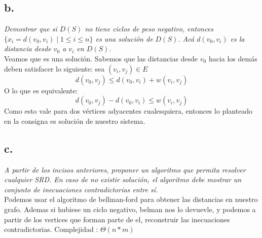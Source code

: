 \documentclass{article}
\begin{document}
\subsection*{b.}
  \textit{Demostrar que si $D(S)$ no tiene ciclos de peso negativo, entonces  \\
  $\{x_i = d(v_0, v_i) \mid 1 \leq i \leq n\}$ es una solución de $D(S)$. Acá $d(v_0, v_i)$ es la distancia desde $v_0$ a $v_i$ en $D(S)$.} \\

Veamos que es una solución. Sabemos que las distancias desde $v_0$ hacia los demás deben satisfacer lo siguiente: sea $(v_i, v_j) \in E$ 
\[
d(v_0, v_j) \leq d(v_0, v_i) + w(v_i, v_j)
\]
O lo que es equivalente:
\[
d(v_0, v_j) - d(v_0, v_i) \leq w(v_i, v_j)
\]
Como esto vale para dos vértices adyacentes cualesquiera, entonces lo planteado en la consigna es solución de nuestro sistema.

\subsection*{c.}
\textit{A partir de los incisos anteriores, proponer un algoritmo que permita resolver cualquier
SRD. En caso de no existir solución, el algoritmo debe mostrar un conjunto de inecuaciones
contradictorias entre sí.} \\

Podemos usar el algoritmo de bellman-ford para obtener las distancias en nuestro grafo. Ademas si hubiese un ciclo negativo, belman nos lo devuevle, y podemos a partir de los vertices que forman parte de el, reconstruir las inecuaciones contradictorias.
Complejidad : $\Theta(n*m)$
\end{document}
